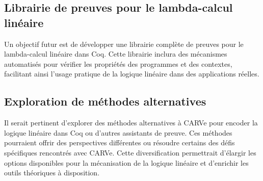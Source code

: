 \subsection{Librairie de preuves pour le lambda-calcul linéaire}

Un objectif futur est de développer une librairie complète de preuves pour le lambda-calcul linéaire dans Coq. Cette librairie inclura des mécanismes automatisés pour vérifier les propriétés des programmes et des contextes, facilitant ainsi l'usage pratique de la logique linéaire dans des applications réelles.

\subsection{Exploration de méthodes alternatives}

Il serait pertinent d'explorer des méthodes alternatives à CARVe pour encoder la logique linéaire dans Coq ou d'autres assistants de preuve. Ces méthodes pourraient offrir des perspectives différentes ou résoudre certains des défis spécifiques rencontrés avec CARVe. Cette diversification permettrait d'élargir les options disponibles pour la mécanisation de la logique linéaire et d'enrichir les outils théoriques à disposition.
